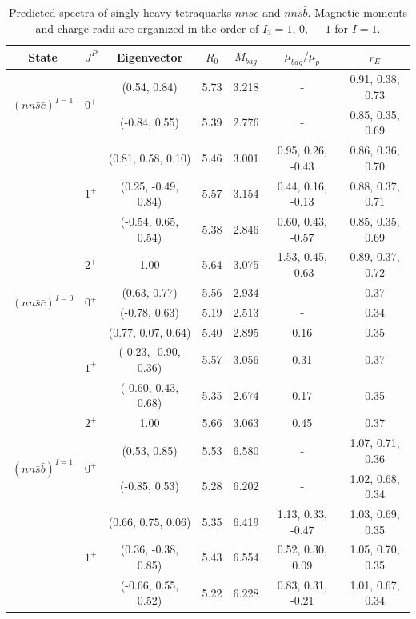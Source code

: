 \documentclass[12pt,onecolumn,floatfix,nofootinbib]{revtex4}
\begin{document}
\renewcommand{\tabcolsep}{0.44cm} \renewcommand{\arraystretch}{1.3}
\begin{table}[!htb]
\caption{Predicted spectra of singly heavy tetraquarks $nn\bar{s}\bar{c}$
and $nn\bar{s}\bar{b}$. Magnetic moments and charge radii are organized in 
the order of $I_{3}=1,\,0,\,-1$ for $I=1$.}
\label{tab:1heavytetraquark}%
\begin{tabular}{ccccccc}
\hline\hline
\textrm{State} & $J^{P}$ & \textrm{Eigenvector} & $R_{0}$ & $M_{bag}$ & $%
\mu_{bag}/\mu_{p}$ & $r_{E}$ \\ \hline
\multirow{2}{*}{${(nn\bar{s}\bar{c})}^{I=1}$} & \multirow{2}{*}{$0^{+}$} &
(0.54, 0.84) & 5.73 & 3.218 & - & 0.91, 0.38, 0.73 \\
&  & (-0.84, 0.55) & 5.39 & 2.776 & - & 0.85, 0.35, 0.69 \\
& \multirow{3}{*}{$1^{+}$} & (0.81, 0.58, 0.10) & 5.46 & 3.001
& 0.95, 0.26, -0.43 & 0.86, 0.36, 0.70 \\
&  & (0.25, -0.49, 0.84) & 5.57 & 3.154 & 0.44, 0.16, -0.13 & 0.88, 0.37, 0.71 \\
&  & (-0.54, 0.65, 0.54) & 5.38 & 2.846 & 0.60, 0.43, -0.57 & 0.85, 0.35, 0.69 \\
& $2^{+}$ & 1.00 & 5.64 & 3.075 & 1.53, 0.45, -0.63 & 0.89, 0.37, 0.72 \\
\multirow{2}{*}{${(nn\bar{s}\bar{c})}^{I=0}$} & \multirow{2}{*}{$0^{+}$} &
(0.63, 0.77) & 5.56 & 2.934 & - & 0.37 \\
&  & (-0.78, 0.63) & 5.19 & 2.513 & - & 0.34 \\
& \multirow{3}{*}{$1^{+}$} & (0.77, 0.07, 0.64) & 5.40 & 2.895 & 0.16 & 0.35 \\
&  & (-0.23, -0.90, 0.36) & 5.57 & 3.056 & 0.31 & 0.37 \\
&  & (-0.60, 0.43, 0.68) & 5.35 & 2.674 & 0.17 & 0.35 \\
& $2^{+}$ & 1.00 & 5.66 & 3.063 & 0.45 & 0.37 \\
\multirow{2}{*}{${(nn\bar{s}\bar{b})}^{I=1}$} & \multirow{2}{*}{$0^{+}$} &
(0.53, 0.85) & 5.53 & 6.580 & - & 1.07, 0.71, 0.36 \\
&  & (-0.85, 0.53) & 5.28 & 6.202 & - & 1.02, 0.68, 0.34 \\
& \multirow{3}{*}{$1^{+}$} & (0.66, 0.75, 0.06) & 5.35 & 6.419
& 1.13, 0.33, -0.47 & 1.03, 0.69, 0.35 \\
&  & (0.36, -0.38, 0.85) & 5.43 & 6.554 & 0.52, 0.30, 0.09 & 1.05, 0.70, 0.35 \\
&  & (-0.66, 0.55, 0.52) & 5.22 & 6.228 & 0.83, 0.31, -0.21 & 1.01, 0.67, 0.34 \\

\end{tabular}
\end{table}
\end{document}
